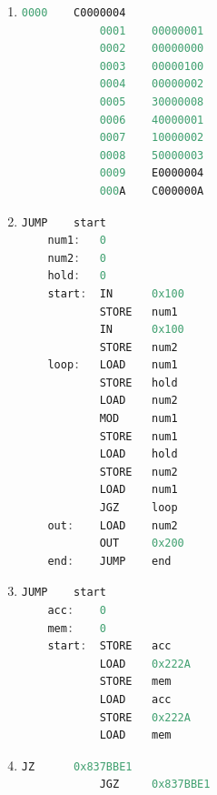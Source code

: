 \documentclass[12pt,letterpaper]{article}
\begin{document}
\begin{enumerate}
        \item %
        	\begin{lstlisting}[language=C, caption={0 - 255}]
		    0000	C0000004
    		0001	00000001 
    		0002	00000000 
    		0003	00000100 
    	    0004	00000002 
    		0005	30000008 
            0006	40000001 
            0007	10000002 
            0008 	50000003 
            0009	E0000004 
    		000A	C000000A 
            \end{lstlisting}
            
        \item %
        	\begin{lstlisting}[language=C, caption={GCD}]
            JUMP	start
    num1:	0
    num2:	0
    hold:	0
    start:  IN		0x100
    		STORE	num1
            IN		0x100
            STORE	num2
	loop:	LOAD	num1
    		STORE	hold
    		LOAD	num2
    		MOD		num1
            STORE	num1
            LOAD	hold
            STORE	num2
            LOAD	num1
            JGZ		loop
    out:	LOAD	num2
    		OUT		0x200
    end:	JUMP	end
            \end{lstlisting}
        
        \pagebreak
        \item %
        	\begin{lstlisting}[language=C, caption={Swap Accumulator and 0x222A}]
            JUMP	start
    acc:	0
    mem:	0
    start:  STORE	acc
    		LOAD	0x222A
            STORE	mem
            LOAD	acc
            STORE	0x222A
            LOAD	mem
            \end{lstlisting}
            
        \item %
        	\begin{lstlisting}[language=C, caption={Jump}]
            JZ		0x837BBE1
            JGZ		0x837BBE1
            \end{lstlisting}
        
    \end{enumerate}
    
\end{document}
